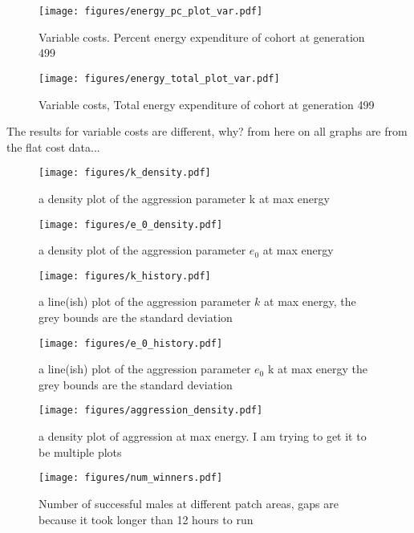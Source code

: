 \documentclass[a4paper,11pt]{article}
\begin{document}
\begin{figure}[h!]
    \centering
    \texttt{[image: figures/energy\_pc\_plot\_var.pdf]}
    \caption{Variable costs. Percent energy expenditure of cohort at generation 499}
    \label{fig:var energy pc}
    \centering
    \texttt{[image: figures/energy\_total\_plot\_var.pdf]}
    \caption{Variable costs, Total energy expenditure of cohort at generation 499}
    \label{fig:var energy total}
\end{figure}

The results for variable costs are different, why? from here on all graphs are from the flat cost data...





\begin{figure}[h!]
    \centering
    \texttt{[image: figures/k\_density.pdf]}
    \caption{a density plot of the aggression parameter k at max energy}
    \label{fig:k density}

    \texttt{[image: figures/e\_0\_density.pdf]}
    \caption{a density plot of the aggression parameter $e_0$ at max energy}
    \label{fig:e_0 density}
\end{figure}

\begin{figure}[h!]
    \centering
    \texttt{[image: figures/k\_history.pdf]}
    \caption{a line(ish) plot of the aggression parameter $k$ at max energy, the grey bounds are the standard deviation}
    \label{fig:k history}

    \texttt{[image: figures/e\_0\_history.pdf]}
    \caption{a line(ish) plot of the aggression parameter $e_0$  k at max energy the grey bounds are the standard deviation}
    \label{fig:e_0 history}
\end{figure}


\begin{figure}[h!]
    \centering
    \texttt{[image: figures/aggression\_density.pdf]}
    \caption{a density plot of aggression at max energy. I am trying to get it to be multiple plots}
    \label{fig:aggression density}
\end{figure}



\begin{figure}[h!]
    \centering
    \texttt{[image: figures/num\_winners.pdf]}
    \caption{Number of successful males at different patch areas, gaps are because it took longer than 12 hours to run}
    \label{fig:num winners}
\end{figure}
\end{document}
